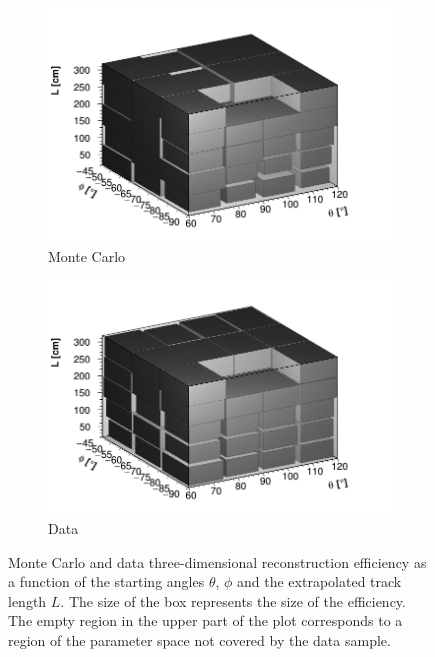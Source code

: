 \documentclass[a4paper,11pt]{article}
\begin{document}
\begin{figure}[htbp]
  \begin{subfigure}{0.495\textwidth}
    \includegraphics[width=\linewidth]{figures/3d_mc.png}
    \caption{Monte Carlo} \label{fig:3d_mc}
  \end{subfigure}
  \begin{subfigure}{0.495\textwidth}
    \includegraphics[width=\linewidth]{figures/3d_data.png}
    \caption{Data} \label{fig:3d_data}
  \end{subfigure}
  \caption{Monte Carlo and data three-dimensional reconstruction efficiency as a function of the starting angles $\theta$, $\phi$ and the extrapolated track length $L$. The size of the box represents the size of the efficiency. The empty region in the upper part of the plot corresponds to a region of the parameter space not covered by the data sample.}\label{fig:3d}
\end{figure}
\end{document}
